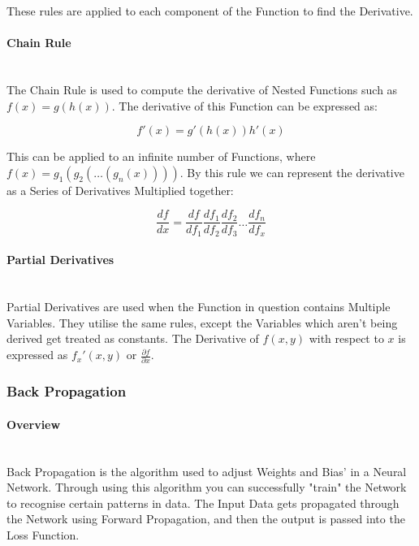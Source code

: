 \begin{flushleft}
                    These rules are applied to each component of the Function to find the Derivative. 

                \paragraph{Chain Rule}  \mbox{} \\
                    \vspace{0.2cm}
                    The Chain Rule is used to compute the derivative of Nested Functions such as $f(x) = g(h(x))$. The derivative of this Function can be expressed as: \\
                    \vspace{0.4cm}

                    \[f'(x) =  g'(h(x))h'(x)\]

                    \vspace{0.4cm}

                    This can be applied to an infinite number of Functions, where $f(x) = g_{1}(g_{2}(\hdots(g_{n}(x))))$. By this rule we can represent the derivative as
                    a Series of Derivatives Multiplied together:

                    \[
                        \frac{df}{dx} = \frac{df}{df_{1}} \frac{df_{1}}{df_{2}} \frac{df_{2}}{df_{3}} \hdots \frac{df_{n}}{df_{x}}
                    \]

                \paragraph{Partial Derivatives}  \mbox{} \\
                    \vspace{0.2cm}
                    Partial Derivatives are used when the Function in question contains Multiple Variables. They utilise the same rules, except the Variables
                    which aren't being derived get treated as constants. The Derivative of $f(x, y)$ with respect to $x$ is expressed as $f_{x}'(x,y)$ or 
                    {\Large $\frac{\partial f}{\partial x}$}. 

            \subsubsection{Back Propagation}
                \paragraph{Overview} \mbox{} \\
                    \vspace{0.2cm}
                    Back Propagation is the algorithm used to adjust Weights and Bias' in a Neural Network. Through using this algorithm you can successfully "train"
                    the Network to recognise certain patterns in data. The Input Data gets propagated through the Network using Forward Propagation, and then the output
                    is passed into the Loss Function.


\end{flushleft}
